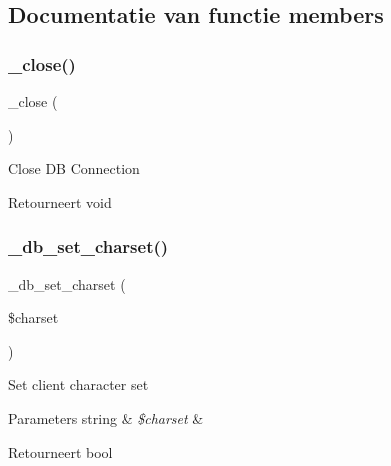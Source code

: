 \subsection{Documentatie van functie members}
\mbox{\label{class_c_i___d_b__mysqli__driver_a4d9082658000e5ede8312067c6dda9db}} 
\subsubsection{\texorpdfstring{\_close()}{\_close()}}
{\footnotesize\ttfamily \+\_\+close (\begin{DoxyParamCaption}{ }\end{DoxyParamCaption})\hspace{0.3cm}{\ttfamily [protected]}}

Close DB Connection

\begin{DoxyReturn}{Retourneert}
void 
\end{DoxyReturn}
\mbox{\label{class_c_i___d_b__mysqli__driver_a2b808d420d8e9fea0b73ad7127f5efb8}} 
\subsubsection{\texorpdfstring{\_db\_set\_charset()}{\_db\_set\_charset()}}
{\footnotesize\ttfamily \+\_\+db\+\_\+set\+\_\+charset (\begin{DoxyParamCaption}\item[{}]{\$charset }\end{DoxyParamCaption})\hspace{0.3cm}{\ttfamily [protected]}}

Set client character set


\begin{DoxyParams}[1]{Parameters}
string & {\em \$charset} & \\
\hline
\end{DoxyParams}
\begin{DoxyReturn}{Retourneert}
bool 
\end{DoxyReturn}
\mbox{\label{class_c_i___d_b__mysqli__driver_af8ef0237bfcdb19215b63fff769e7a55}} 
